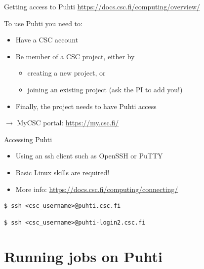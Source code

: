 \documentclass[aspectratio=1610,14pt]{beamer}
\newcommand{\link}[1]{\alert{\url{#1}}}
\begin{document}
\begin{frame}{Getting access to Puhti}
  \link{https://docs.csc.fi/computing/overview/}

  \vspace{1em}

  To use Puhti you need to:
  \begin{itemize}
  \item Have a CSC account
  \item Be member of a CSC project, either by
    \begin{itemize}
    \item creating a new project, or
    \item joining an existing project (ask the PI to add you!)
    \end{itemize}
  \item Finally, the project needs to have Puhti access
  \end{itemize}

  \vspace{1em}

  $\rightarrow$ \quad MyCSC portal: \link{https://my.csc.fi/}

\end{frame}

\begin{frame}[fragile]{Accessing Puhti}
  \begin{itemize}
  \item Using an ssh client such as OpenSSH or PuTTY
  \item Basic Linux skills are required!
  \item More info: \link{https://docs.csc.fi/computing/connecting/}
  \end{itemize}

  \vspace{1em}

\begin{verbatim}
$ ssh <csc_username>@puhti.csc.fi
\end{verbatim}

\begin{verbatim}
$ ssh <csc_username>@puhti-login2.csc.fi
\end{verbatim}

\end{frame}

\section{Running jobs on Puhti}
\end{document}
